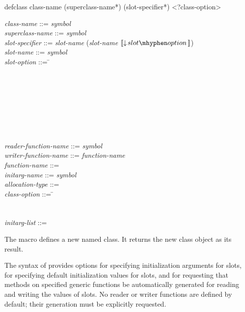 \begin{defmac}
defclass class-name ({superclass-name}*)
         ({slot-specifier}*) <?class-option>

\begin{tabbing}
\emph{class-name} ::= \emph{symbol} \\
\emph{superclass-name} ::= \emph{symbol}\\
\emph{slot-specifier} ::= \emph{slot-name} {\Mor} (\emph{slot-name}
$\lbrack\!\lbrack\downarrow\!slot\mhyphen option\,\rbrack\!\rbrack$)\\
\emph{slot-name} ::= \emph{symbol}\\
\emph{slot-option} ::= \= \\
\Mor~ \\
\Mor~ \\
\Mor~ \\
\Mor~ \\
\Mor~ \\
\Mor~ \\
\Mor~
\end{tabbing}

\begin{tabbing}
\emph{reader-function-name} ::= \emph{symbol}\\
\emph{writer-function-name} ::= \emph{function-name}\\
\emph{function-name} ::= \\
\emph{initarg-name} ::= \emph{symbol}\\
\emph{allocation-type} ::= \\
\emph{class-option} ::= \= \\
\Mor~ \\
\Mor~  \\
\emph{initarg-list} ::= 
\end{tabbing}
The macro  defines a new named class.  It returns the new class
object as its result.

The syntax of  provides options for specifying
initialization arguments for slots, for specifying default
initialization values for slots, and for requesting that methods on
specified generic functions be automatically generated for reading and
writing the values of slots.  No reader or writer functions are
defined by default; their generation must be explicitly requested.


\end{defmac}
